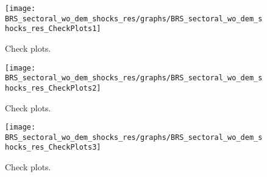  
\begin{figure}[H]
\centering 
\texttt{[image: BRS\_sectoral\_wo\_dem\_shocks\_res/graphs/BRS\_sectoral\_wo\_dem\_shocks\_res\_CheckPlots1]}
\caption{Check plots.}\label{Fig:CheckPlots:1}
\end{figure}
 
\begin{figure}[H]
\centering 
\texttt{[image: BRS\_sectoral\_wo\_dem\_shocks\_res/graphs/BRS\_sectoral\_wo\_dem\_shocks\_res\_CheckPlots2]}
\caption{Check plots.}\label{Fig:CheckPlots:2}
\end{figure}
 
\begin{figure}[H]
\centering 
\texttt{[image: BRS\_sectoral\_wo\_dem\_shocks\_res/graphs/BRS\_sectoral\_wo\_dem\_shocks\_res\_CheckPlots3]}
\caption{Check plots.}\label{Fig:CheckPlots:3}
\end{figure}
 

